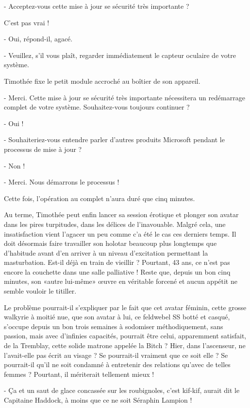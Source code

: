 - Acceptez-vous cette mise à jour se sécurité très importante ?

C’est pas vrai !

- Oui, répond-il, agacé.

- Veuillez, s’il vous plaît, regarder immédiatement le capteur oculaire de votre système.

Timothée fixe le petit module accroché au boîtier de son appareil.

- Merci. Cette mise à jour se sécurité très importante nécessitera un redémarrage complet de votre système. Souhaitez-vous toujours continuer ?

- Oui !

- Souhaiteriez-vous entendre parler d’autres produits Microsoft pendant le processus de mise à jour ?

- Non !

- Merci. Nous démarrons le processus !

Cette fois, l’opération au complet n’aura duré que cinq minutes.

Au terme, Timothée peut enfin lancer sa session érotique et plonger son avatar dans les pires turpitudes, dans les délices de l’inavouable. Malgré cela, une insatisfaction vient l’agacer un peu comme c’a été le cas ces derniers temps. Il doit désormais faire travailler son holotar beaucoup plus longtemps que d’habitude avant d’en arriver à un niveau d’excitation permettant la masturbation. Est-il déjà en train de vieillir ? Pourtant, 43 ans, ce n’est pas encore la couchette dans une salle palliative ! Reste que, depuis un bon cinq minutes, son «autre lui-même» œuvre en véritable forcené et aucun appétit ne semble vouloir le titiller.

Le problème pourrait-il s’expliquer par le fait que cet avatar féminin, cette grosse walkyrie à moitié nue, que son avatar à lui, ce feldwebel SS botté et casqué, s’occupe depuis un bon trois semaines à sodomiser méthodiquement, sans passion, mais avec d’infinies capacités, pourrait être celui, apparemment satisfait, de la Tremblay, cette solide matrone appelée la Bitch ? Hier, dans l’ascenseur, ne l’avait-elle pas écrit au visage ? Se pourrait-il vraiment que ce soit elle ? Se pourrait-il qu’il ne soit condamné à entretenir des relations qu’avec de telles femmes ? Pourtant, il mériterait tellement mieux !

- Ça et un saut de glace concassée sur les roubignoles, c’est kif-kif, aurait dit le Capitaine Haddock, à moins que ce ne soit Séraphin Lampion ! 

